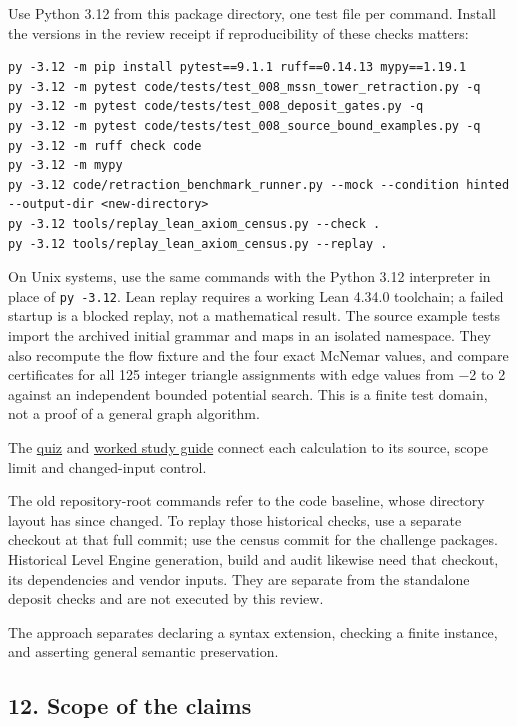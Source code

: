 \documentclass[
  11pt,
]{article}
\newcommand{\passthrough}[1]{#1}
\begin{document}
Use Python 3.12 from this package directory, one test file per command.
Install the versions in the review receipt if reproducibility of these
checks matters:

\begin{lstlisting}
py -3.12 -m pip install pytest==9.1.1 ruff==0.14.13 mypy==1.19.1
py -3.12 -m pytest code/tests/test_008_mssn_tower_retraction.py -q
py -3.12 -m pytest code/tests/test_008_deposit_gates.py -q
py -3.12 -m pytest code/tests/test_008_source_bound_examples.py -q
py -3.12 -m ruff check code
py -3.12 -m mypy
py -3.12 code/retraction_benchmark_runner.py --mock --condition hinted --output-dir <new-directory>
py -3.12 tools/replay_lean_axiom_census.py --check .
py -3.12 tools/replay_lean_axiom_census.py --replay .
\end{lstlisting}

On Unix systems, use the same commands with the Python 3.12 interpreter
in place of \passthrough{\lstinline!py -3.12!}. Lean replay requires a
working Lean 4.34.0 toolchain; a failed startup is a blocked replay, not
a mathematical result. The source example tests import the archived
initial grammar and maps in an isolated namespace. They also recompute
the flow fixture and the four exact McNemar values, and compare
certificates for all 125 integer triangle assignments with edge values
from −2 to 2 against an independent bounded potential search. This is a
finite test domain, not a proof of a general graph algorithm.

The
\href{../../008_pfp_mssn_tower_challenges_and_retraction_benchmarks/_lev_examiner_theoretical_minimum_quiz/quiz.md}{quiz}
and
\href{../../008_pfp_mssn_tower_challenges_and_retraction_benchmarks/_lev_examiner_theoretical_minimum_quiz/study_guide.md}{worked
study guide} connect each calculation to its source, scope limit and
changed-input control.

The old repository-root commands refer to the code baseline, whose
directory layout has since changed. To replay those historical checks,
use a separate checkout at that full commit; use the census commit for
the challenge packages. Historical Level Engine generation, build and
audit likewise need that checkout, its dependencies and vendor inputs.
They are separate from the standalone deposit checks and are not
executed by this review.

The approach separates declaring a syntax extension, checking a finite
instance, and asserting general semantic preservation.

\hypertarget{scope-of-the-claims}{%
\subsection{12. Scope of the claims}\label{scope-of-the-claims}}
\end{document}
